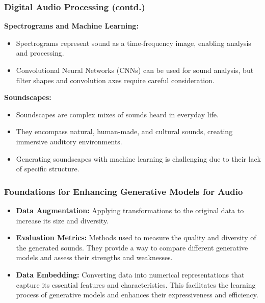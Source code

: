 \begin{frame}
    \frametitle{Digital Audio Processing (contd.)}

    \textbf{Spectrograms and Machine Learning:}
    \begin{itemize}
        \item Spectrograms represent sound as a time-frequency image, enabling analysis and processing.
        \item Convolutional Neural Networks (CNNs) can be used for sound analysis, but filter shapes and convolution axes require careful consideration.
    \end{itemize}

    \textbf{Soundscapes:}
    \begin{itemize}
        \item Soundscapes are complex mixes of sounds heard in everyday life.
        \item They encompass natural, human-made, and cultural sounds, creating immersive auditory environments.
        \item Generating soundscapes with machine learning is challenging due to their lack of specific structure.
    \end{itemize}
\end{frame}



\begin{frame}
    \frametitle{Foundations for Enhancing Generative Models for Audio}

    \begin{itemize}
        \item \textbf{Data Augmentation:} Applying transformations to the original data to increase its size and diversity.
        \item \textbf{Evaluation Metrics:} Methods used to measure the quality and diversity of the generated sounds. They provide a way to compare different generative models and assess their strengths and weaknesses.
        \item \textbf{Data Embedding:} Converting data into numerical representations that capture its essential features and characteristics. This facilitates the learning process of generative models and enhances their expressiveness and efficiency.
    \end{itemize}

\end{frame}


